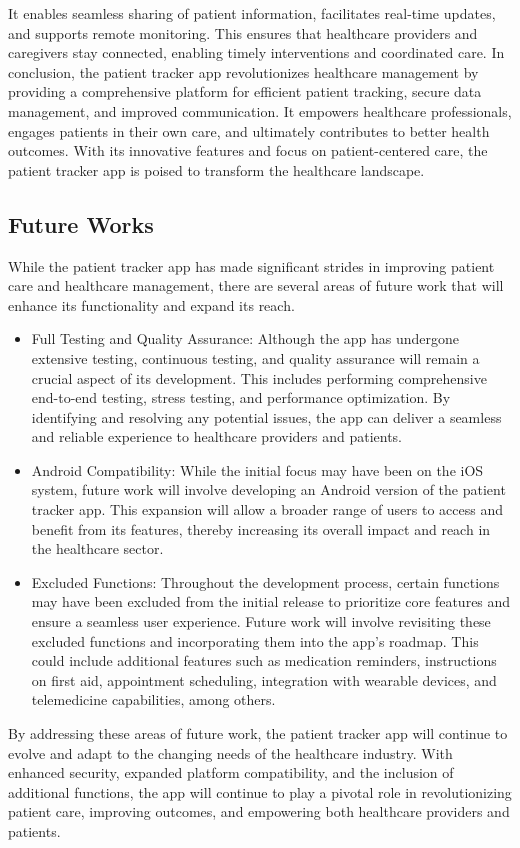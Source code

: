 \documentclass[12pt]{article}
\begin{document}
			It enables seamless sharing of patient information, facilitates real-time updates,
			and supports remote monitoring. This ensures that healthcare providers and caregivers
			stay connected, enabling timely interventions and coordinated care.
			In conclusion, the patient tracker app revolutionizes healthcare management by providing
			a comprehensive platform for efficient patient tracking, secure data management, and
			improved communication. It empowers healthcare professionals, engages patients in their
			own care, and ultimately contributes to better health outcomes. With its innovative
			features and focus on patient-centered care, the patient tracker app is poised to
			transform the healthcare landscape.
			\subsection{Future Works}
			
			While the patient tracker app has made significant strides in improving patient care and
			healthcare management, there are several areas of future work that will enhance its
			functionality and expand its reach.
			\begin{itemize}
			
			\item Full Testing and Quality Assurance: Although the app has undergone extensive
			testing, continuous testing, and quality assurance will remain a crucial aspect of its
			development. This includes performing comprehensive end-to-end testing, stress
			testing, and performance optimization. By identifying and resolving any potential
			issues, the app can deliver a seamless and reliable experience to healthcare
			providers and patients.
			\item  Android Compatibility: While the initial focus may have been on the iOS system,
			future work will involve developing an Android version of the patient tracker app. 
			This expansion will allow a broader range of users to access and benefit from its
			features, thereby increasing its overall impact and reach in the healthcare sector.
			\item  Excluded Functions: Throughout the development process, certain functions may
			have been excluded from the initial release to prioritize core features and ensure a
			seamless user experience. Future work will involve revisiting these excluded
			functions and incorporating them into the app's roadmap. This could include
			additional features such as medication reminders, instructions on first aid,
			appointment scheduling, integration with wearable devices, and telemedicine
			capabilities, among others.
			\end{itemize}
			
			By addressing these areas of future work, the patient tracker app will continue to evolve
			and adapt to the changing needs of the healthcare industry. With enhanced security,
			expanded platform compatibility, and the inclusion of additional functions, the app will
			continue to play a pivotal role in revolutionizing patient care, improving outcomes, and
			empowering both healthcare providers and patients.
	
	
\end{document}
